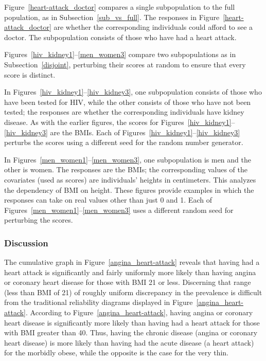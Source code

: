 \documentclass[]{fairmeta}
\begin{document}
Figure~\ref{heart-attack_doctor} compares a single subpopulation
to the full population, as in Subsection~\ref{sub_vs_full}.
The responses in Figure~\ref{heart-attack_doctor}
are whether the corresponding individuals could afford to see a doctor.
The subpopulation consists of those who have had a heart attack.

Figures~\ref{hiv_kidney1}--\ref{men_women3} compare two subpopulations
as in Subsection~\ref{disjoint}, perturbing their scores at random
to ensure that every score is distinct.

In Figures~\ref{hiv_kidney1}--\ref{hiv_kidney3},
one subpopulation consists of those who have been tested for HIV,
while the other consists of those who have not been tested;
the responses are whether the corresponding individuals have kidney disease.
As with the earlier figures, the scores
for Figures~\ref{hiv_kidney1}--\ref{hiv_kidney3} are the BMIs.
Each of Figures~\ref{hiv_kidney1}--\ref{hiv_kidney3}
perturbs the scores using a different seed for the random number generator.

In Figures~\ref{men_women1}--\ref{men_women3},
one subpopulation is men and the other is women.
The responses are the BMIs; the corresponding values of the covariates
(used as scores) are individuals' heights in centimeters.
This analyzes the dependency of BMI on height.
These figures provide examples in which the responses can take on real values
other than just 0 and 1.
Each of Figures~\ref{men_women1}--\ref{men_women3}
uses a different random seed for perturbing the scores.

\subsubsection{Discussion}
\label{brfss_discussion}

The cumulative graph in Figure~\ref{angina_heart-attack} reveals that
having had a heart attack is significantly and fairly uniformly more likely
than having angina or coronary heart disease for those with BMI 21 or less.
Discerning that range (less than BMI of 21) of roughly uniform discrepancy
in the prevalence is difficult from the traditional reliability diagrams
displayed in Figure~\ref{angina_heart-attack}.
According to Figure~\ref{angina_heart-attack},
having angina or coronary heart disease is significantly more likely
than having had a heart attack for those with BMI greater than 40.
Thus, having the chronic disease (angina or coronary heart disease)
is more likely than having had the acute disease (a heart attack)
for the morbidly obese, while the opposite is the case for the very thin.
\end{document}
